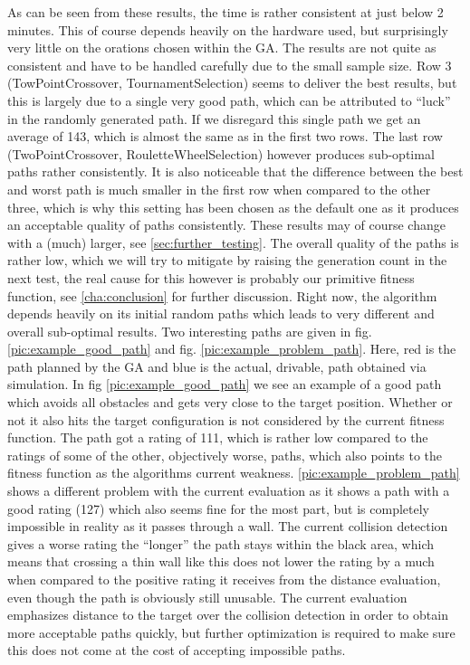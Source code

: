 As can be seen from these results, the time is rather consistent at just below 2 minutes. This of course depends heavily on the hardware used, but surprisingly very little on the orations chosen within the GA. The results are not quite as consistent and have to be handled carefully due to the small sample size. Row 3 (TowPointCrossover, TournamentSelection) seems to deliver the best results, but this is largely due to a single very good path, which can be attributed to "`luck"' in the randomly generated path. If we disregard this single path we get an average of 143, which is almost the same as in the first two rows. The last row (TwoPointCrossover, RouletteWheelSelection) however produces sub-optimal paths rather consistently. It is also noticeable that the difference between the best and worst path is much smaller in the first row when compared to the other three, which is why this setting has been chosen as the default one as it produces an acceptable quality of paths consistently. These results may of course change with a (much) larger, see \ref{sec:further_testing}.
The overall quality of the paths is rather low, which we will try to mitigate by raising the generation count in the next test, the real cause for this however is probably our primitive fitness function, see \ref{cha:conclusion} for further discussion. Right now, the algorithm depends heavily on its initial random paths which leads to very different and overall sub-optimal results.
Two interesting paths are given in fig. \ref{pic:example_good_path} and fig. \ref{pic:example_problem_path}. Here, red is the path planned by the GA and blue is the actual, drivable, path obtained via simulation. In fig \ref{pic:example_good_path} we see an example of a good path which avoids all obstacles and gets very close to the target position. Whether or not it also hits the target configuration is not considered by the current fitness function. The path got a rating of 111, which is rather low compared to the ratings of some of the other, objectively worse, paths, which also points to the fitness function as the algorithms current weakness. \ref{pic:example_problem_path} shows a different problem with the current evaluation as it shows a path with a good rating (127) which also seems fine for the most part, but is completely impossible in reality as it passes through a wall. The current collision detection gives a worse rating the "`longer"' the path stays within the black area, which means that crossing a thin wall like this does not lower the rating by a much when compared to the positive rating it receives from the distance evaluation, even though the path is obviously still unusable. The current evaluation emphasizes distance to the target over the collision detection in order to obtain more acceptable paths quickly, but further optimization is required to make sure this does not come at the cost of accepting impossible paths.

